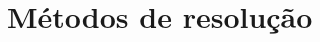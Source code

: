 \documentclass{beamer}
\newenvironment{outeritemize}{\begin{itemize}}{\end{itemize}\vspace{12pt}}
\begin{document}

    



\section{Métodos de resolução}
\end{document}
